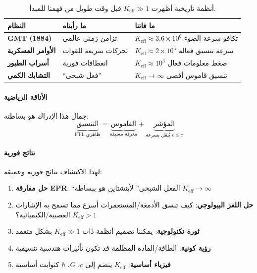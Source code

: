 \documentclass[11pt,a4paper]{article}
\begin{document}
	\begin{table}[htbp]
		\centering
		\begin{english}
			\begin{tabular}{p{}p{}p{}}
				\toprule
				\textbf{النظام} & \textbf{ما رأيناه} & \textbf{ما فاتنا} \\
				\midrule
				\textbf{GMT (1884)} & تزامن زمني عالمي & $K_{\mathrm{eff}} \approx 3.6\times10^6$ تكافؤ سرعة الضوء \\
				\textbf{الأوامر العسكرية} & تحركات سريعة للقوات & $K_{\mathrm{eff}} \approx 2\times10^5$ سرعة تنسيق فعالة \\
				\textbf{أسراب الطيور} & انعطافات فورية & $K_{\mathrm{eff}} \approx 10^3$ ضغط معلومات فعال \\
				\textbf{التشابك الكمي} & ``فعل شبحى'' & $K_{\mathrm{eff}} \to \infty$ تنسيق قاموس أقصى \\
				\bottomrule
			\end{tabular}
		\end{english}
		\caption{أنظمة تاريخية أظهرت $K_{\mathrm{eff}} \gg 1$ قبل وقت طويل من فهمنا للمبدأ.}
	\end{table}
	
	\paragraph{الأناقة الرياضية}
	جمال هذا الإدراك هو بساطته:
	\begin{equation}
		\underbrace{\text{التنسيق}}_{\text{FTL ظاهري}} = 
		\underbrace{\text{القاموس}}_{\text{معرفة مسبقة}} + 
		\underbrace{\text{المؤشر}}_{\text{يُنقل بسرعة } v \leq c}
	\end{equation}
	
	\paragraph{نتائج فورية}
	لهذا الاكتشاف نتائج فورية وعميقة:
	\begin{enumerate}
		\item \textbf{حل مفارقة EPR}: ``الفعل الشبحى'' لأينشتاين هو ببساطة $K_{\mathrm{eff}} \to \infty$
		\item \textbf{حل اللغز البيولوجي}: كيف تنسق الأدمغة/المستعمرات أسرع مما تسمح به الإشارات العصبية/الكيميائية؟ $K_{\mathrm{eff}} > 1$
		\item \textbf{ثورة تكنولوجية}: يمكننا تصميم أنظمة ذات $K_{\mathrm{eff}} \gg 1$ بشكل متعمد
		\item \textbf{رؤية كونية}: الطاقة/المادة المظلمة قد تكون تأثيرات هندسية تنسيقية
		\item \textbf{فيزياء أساسية}: $K_{\mathrm{eff}}$ ينضم إلى $c$، $G$، $\hbar$ كثوابت أساسية
	\end{enumerate}
	
\end{document}
